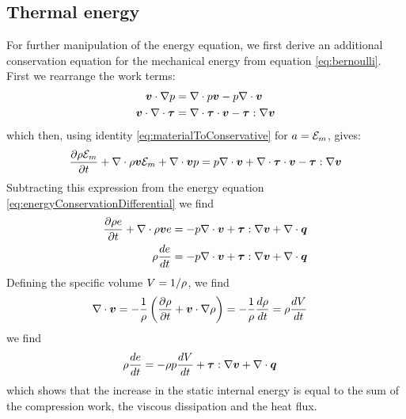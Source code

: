 \subsection{Thermal energy}

For further manipulation of the energy equation, we first derive an
additional conservation equation for the mechanical energy from
equation \ref{eq:bernoulli}. First we rearrange the work terms:
\begin{align*}
  \boldsymbol {v} \cdot \nabla p &= \nabla \cdot p \boldsymbol {v} - p \nabla \cdot \boldsymbol {v} \\
  \boldsymbol {v} \cdot \nabla \cdot \boldsymbol {\tau} &= \nabla \cdot \boldsymbol {\tau} \cdot \boldsymbol {v} - \boldsymbol {\tau} : \nabla \boldsymbol {v}  
\end{align*}
which then, using identity \ref{eq:materialToConservative} for $a =
\mathcal E_m$, gives:
\begin{equation}
  \frac{\partial \rho \mathcal E_m}{\partial t} + 
  \nabla \cdot \rho \boldsymbol {v} \mathcal E_m + 
  \nabla \cdot \boldsymbol {v} p = p \nabla \cdot \boldsymbol {v} +
  \nabla \cdot \boldsymbol {\tau} \cdot \boldsymbol {v} - \boldsymbol {\tau} : \nabla \boldsymbol {v} 
  \label{eq:conservationKineticEnergy}
\end{equation}
Subtracting this expression from the energy equation
\ref{eq:energyConservationDifferential} we find
\begin{equation}
  \begin{split}
    \frac{\partial \rho e}{\partial t} + \nabla \cdot \rho \boldsymbol {v} e &= - p \nabla \cdot \boldsymbol {v} +
    \boldsymbol {\tau} : \nabla \boldsymbol {v} + \nabla \cdot \boldsymbol {q} \\
    \rho \frac{de}{dt} &= - p \nabla \cdot \boldsymbol {v} + 
    \boldsymbol {\tau} : \nabla \boldsymbol {v} + \nabla \cdot \boldsymbol {q} 
  \end{split}
  \label{eq:conservationInternalEnergy}
\end{equation}
Defining the specific volume $V = 1/\rho$, we find
\begin{align*}
  \nabla \cdot \boldsymbol {v} &= - \frac{1}{\rho} \left(\frac{\partial \rho}{\partial t} + \boldsymbol {v} \cdot \nabla \rho\right) = - \frac{1}{\rho} \frac{d\rho}{dt} = \rho \frac{dV}{dt}
\end{align*}
we find
\begin{equation}
  \begin{split}
  \rho \frac{de}{dt} &= - \rho p \frac{dV}{dt} +
  \boldsymbol {\tau} : \nabla \boldsymbol {v} + \nabla \cdot \boldsymbol {q} 
  \end{split}
  \label{eq:materialInternalEnergy}
\end{equation}
which shows that the increase in the static internal energy is equal
to the sum of the compression work, the viscous dissipation and the
heat flux.

